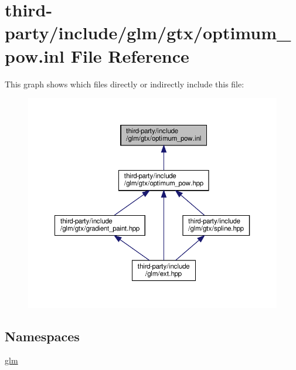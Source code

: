 \hypertarget{optimum__pow_8inl}{}\section{third-\/party/include/glm/gtx/optimum\+\_\+pow.inl File Reference}
\label{optimum__pow_8inl}
This graph shows which files directly or indirectly include this file\+:
\nopagebreak
\begin{figure}[H]
\begin{center}
\leavevmode
\includegraphics[width=350pt]{optimum__pow_8inl__dep__incl}
\end{center}
\end{figure}
\subsection*{Namespaces}
\begin{DoxyCompactItemize}
\item 
 \hyperlink{namespaceglm}{glm}
\end{DoxyCompactItemize}
